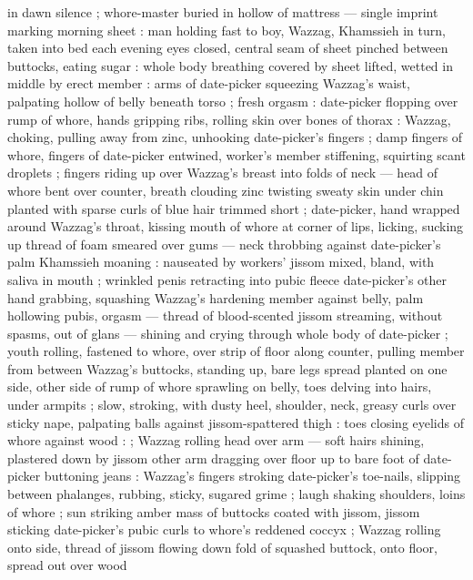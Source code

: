 in dawn silence ; whore-master buried in hollow of mattress --- single imprint marking morning sheet
: man holding fast to boy, Wazzag, Khamssieh in turn, taken into bed each evening {\dashcom} eyes
closed, central seam of sheet pinched between buttocks, eating sugar : whole body breathing covered
by sheet lifted, wetted in middle by erect member : arms of date-picker squeezing Wazzag's waist,
palpating hollow of belly beneath torso ; fresh orgasm : date-picker flopping over rump of whore,
hands gripping ribs, rolling skin over bones of thorax : Wazzag, choking, pulling away from zinc,
unhooking date-picker's fingers ; damp fingers of whore, fingers of date-picker entwined, worker's
member stiffening, squirting scant droplets ; fingers riding up over Wazzag's breast into folds of
neck --- head of whore bent over counter, breath clouding zinc {\dashcom} twisting sweaty skin under
chin planted with sparse curls of blue hair trimmed short ; date-picker, hand wrapped around
Wazzag's throat, kissing mouth of whore at corner of lips, licking, sucking up thread of foam
smeared over gums --- neck throbbing against date-picker's palm {\slashsemi} Khamssieh moaning :
nauseated by workers' jissom mixed, bland, with saliva in mouth ; wrinkled penis retracting into
pubic fleece {\slashsemi} date-picker's other hand grabbing, squashing Wazzag's hardening member
against belly, palm hollowing pubis, orgasm --- thread of blood-scented jissom streaming, without
spasms, out of glans --- shining and crying through whole body of date-picker ; youth rolling,
fastened to whore, over strip of floor along counter, pulling member from between Wazzag's buttocks,
standing up, bare legs spread planted on one side, other side of rump of whore sprawling on belly,
toes delving into hairs, under armpits ; slow, stroking, with dusty heel, shoulder, neck, greasy
curls over sticky nape, palpating balls against jissom-spattered thigh : toes closing eyelids of
whore against wood : {\td}  ; Wazzag rolling head over arm --- soft hairs shining, plastered down by
jissom {\dashcom} other arm dragging over floor up to bare foot of date-picker buttoning jeans :
Wazzag's fingers stroking date-picker's toe-nails, slipping between phalanges, rubbing, sticky,
sugared grime ; laugh shaking shoulders, loins of whore ; sun striking amber mass of buttocks coated
with jissom, jissom sticking date-picker's pubic curls to whore's reddened coccyx ; Wazzag rolling
onto side, thread of jissom flowing down fold of squashed buttock, onto floor, spread out over wood
